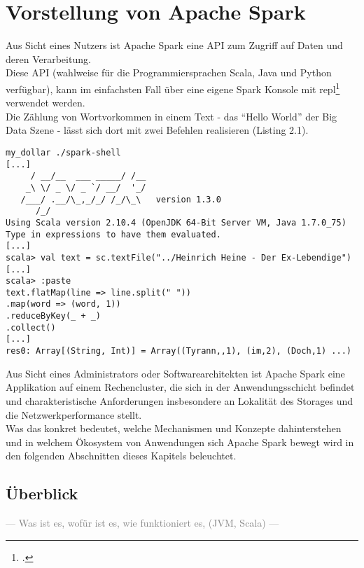 \chapter{Vorstellung von Apache Spark}
Aus Sicht eines Nutzers ist Apache Spark eine API zum Zugriff auf Daten und deren Verarbeitung.\\

Diese API (wahlweise für die Programmiersprachen Scala, Java und Python verfügbar), kann im einfachsten Fall über eine eigene Spark Konsole mit \gls{repl}\footcite{Hail} verwendet werden.\\
Die Zählung von Wortvorkommen in einem Text - das "`Hello World"' der Big Data Szene - lässt sich dort mit zwei Befehlen realisieren (Listing 2.1).\\

\begin{lstlisting}[caption=Word Count in der Spark Konsole]
my_dollar ./spark-shell
[...]
     / __/__  ___ _____/ /__
    _\ \/ _ \/ _ `/ __/  '_/
   /___/ .__/\_,_/_/ /_/\_\   version 1.3.0
      /_/
Using Scala version 2.10.4 (OpenJDK 64-Bit Server VM, Java 1.7.0_75)
Type in expressions to have them evaluated.
[...]
scala> val text = sc.textFile("../Heinrich Heine - Der Ex-Lebendige")
[...]
scala> :paste
text.flatMap(line => line.split(" "))
.map(word => (word, 1))
.reduceByKey(_ + _)
.collect()
[...]
res0: Array[(String, Int)] = Array((Tyrann,,1), (im,2), (Doch,1) ...)

\end{lstlisting}


Aus Sicht eines Administrators oder Softwarearchitekten ist Apache Spark eine Applikation auf einem Rechencluster, die sich in der Anwendungsschicht befindet und charakteristische Anforderungen insbesondere an Lokalität des Storages und die Netzwerkperformance stellt.\\

Was das konkret bedeutet, welche Mechanismen und Konzepte dahinterstehen und in welchem Ökosystem von Anwendungen sich Apache Spark bewegt wird in den folgenden Abschnitten dieses Kapitels beleuchtet.

\section{Überblick}
\textcolor{gray}{--- Was ist es, wofür ist es, wie funktioniert es, (JVM, Scala) ---}

